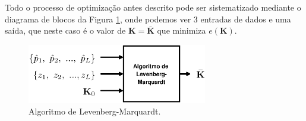 \documentclass[12pt]{article}
\begin{document}
Todo o processo de optimização antes descrito pode ser sistematizado mediante o diagrama de blocos 
da Figura \ref{fig:Diagrama6}, onde podemos ver 3 entradas de dados e uma saída,
que neste caso é o valor de $\mathbf{K}=\mathbf{\bar{K}}$ que minimiza $e\left(\mathbf{K}\right)$.
\begin{figure}[!h]
     \centering
         \includegraphics[width=0.7\textwidth]{Diagrama6.eps}
\caption{Algoritmo de Levenberg-Marquardt.}
\label{fig:Diagrama6}
\end{figure}
\printbibliography
\end{document}
